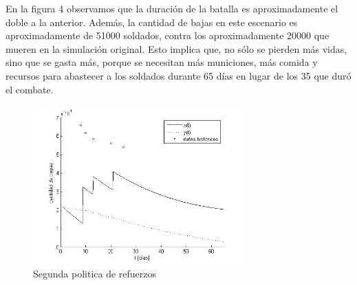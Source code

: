 \documentclass[10pt,journal,compsoc]{IEEEtran}
\begin{document}
En la figura 4 observamos que la duraci\'on de la batalla es aproximadamente el doble a la anterior. Adem\'as, 
la cantidad de bajas en este escenario es aproximadamente de 51000 soldados, contra los aproximadamente 20000 que mueren en la simulaci\'on original.  Esto implica que, no s\'olo se pierden 
m\'as vidas, sino que se gasta m\'as, porque se necesitan m\'as municiones, m\'as comida y recursos para abastecer a los soldados durante 65 d\'ias en lugar de 
los 35 que dur\'o el combate.

 
%
%



\begin{figure}[t]
\label{fig:refuerzos2}
\centering
\includegraphics[width=3.2in]{grafico3_bis}
\caption{Segunda politica de refuerzos}
\end{figure}


\end{document}
